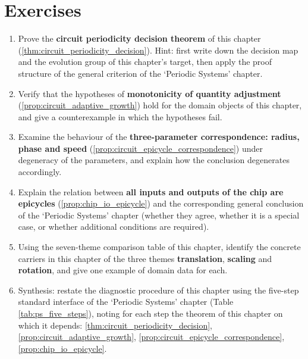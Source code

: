 \section*{Exercises}

\begin{enumerate}[leftmargin=3em, label=\textbf{Exercise \arabic*}]
    \item Prove the \textbf{circuit periodicity decision theorem} of this chapter (\ref{thm:circuit_periodicity_decision}). Hint: first write down the decision map and the evolution group of this chapter's target, then apply the proof structure of the general criterion of the `Periodic Systems' chapter.

    \item Verify that the hypotheses of \textbf{monotonicity of quantity adjustment} (\ref{prop:circuit_adaptive_growth}) hold for the domain objects of this chapter, and give a counterexample in which the hypotheses fail.

    \item Examine the behaviour of the \textbf{three-parameter correspondence: radius, phase and speed} (\ref{prop:circuit_epicycle_correspondence}) under degeneracy of the parameters, and explain how the conclusion degenerates accordingly.

    \item Explain the relation between \textbf{all inputs and outputs of the chip are epicycles} (\ref{prop:chip_io_epicycle}) and the corresponding general conclusion of the `Periodic Systems' chapter (whether they agree, whether it is a special case, or whether additional conditions are required).

    \item Using the seven-theme comparison table of this chapter, identify the concrete carriers in this chapter of the three themes \textbf{translation}, \textbf{scaling} and \textbf{rotation}, and give one example of domain data for each.

    \item Synthesis: restate the diagnostic procedure of this chapter using the five-step standard interface of the `Periodic Systems' chapter (Table \ref{tab:ps_five_steps}), noting for each step the theorem of this chapter on which it depends: \ref{thm:circuit_periodicity_decision}, \ref{prop:circuit_adaptive_growth}, \ref{prop:circuit_epicycle_correspondence}, \ref{prop:chip_io_epicycle}.
\end{enumerate}


